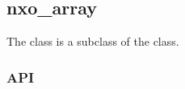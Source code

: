 %
%
%
%
%

\subsection{nxo\_array}
\label{nxo_array}

The  class is a subclass of the  class.

\subsubsection{API}

